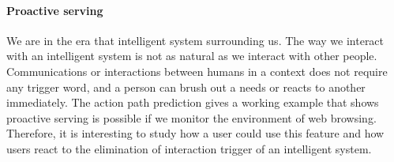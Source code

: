 \paragraph{Proactive serving} 
We are in the era that intelligent system surrounding us. The way we interact with 
an intelligent system is not as natural as we interact with other people. 
Communications or interactions between humans in a context does not require any trigger word,
and a person can brush out a needs or reacts to another immediately.
The action path prediction gives a working example that shows proactive serving is possible
if we monitor the environment of web browsing. Therefore, it is interesting to study
how a user could use this feature and how users react to the elimination of interaction trigger
of an intelligent system.

\cleardoublepage